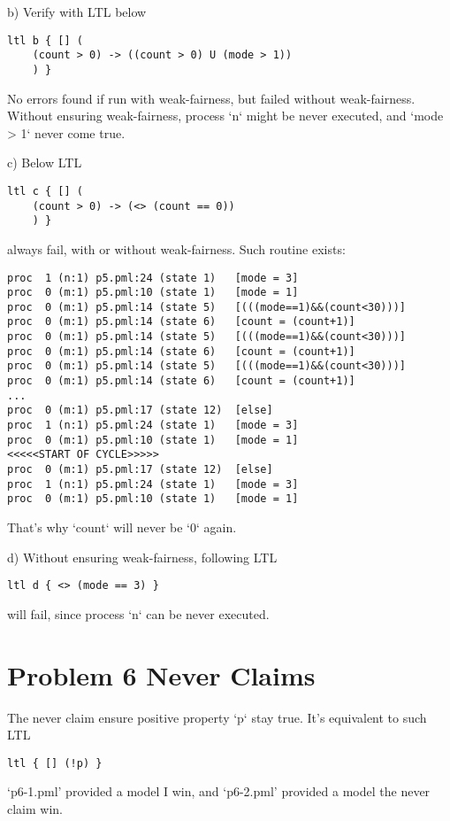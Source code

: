 \documentclass{ctexart}
\begin{document}
b) Verify with LTL below
\begin{lstlisting}[frame=single]
ltl b { [] (
	(count > 0) -> ((count > 0) U (mode > 1))
	) }
\end{lstlisting}
No errors found if run with weak-fairness, but failed without weak-fairness. Without ensuring weak-fairness, process `n` might be never executed, and `mode > 1` never come true.

c) Below LTL
\begin{lstlisting}[frame=single]
ltl c { [] (
	(count > 0) -> (<> (count == 0))
	) }
\end{lstlisting}
always fail, with or without weak-fairness. Such routine exists:
\begin{lstlisting}[frame=single]
proc  1 (n:1) p5.pml:24 (state 1)	[mode = 3]
proc  0 (m:1) p5.pml:10 (state 1)	[mode = 1]
proc  0 (m:1) p5.pml:14 (state 5)	[(((mode==1)&&(count<30)))]
proc  0 (m:1) p5.pml:14 (state 6)	[count = (count+1)]
proc  0 (m:1) p5.pml:14 (state 5)	[(((mode==1)&&(count<30)))]
proc  0 (m:1) p5.pml:14 (state 6)	[count = (count+1)]
proc  0 (m:1) p5.pml:14 (state 5)	[(((mode==1)&&(count<30)))]
proc  0 (m:1) p5.pml:14 (state 6)	[count = (count+1)]
...
proc  0 (m:1) p5.pml:17 (state 12)	[else]
proc  1 (n:1) p5.pml:24 (state 1)	[mode = 3]
proc  0 (m:1) p5.pml:10 (state 1)	[mode = 1]
<<<<<START OF CYCLE>>>>>
proc  0 (m:1) p5.pml:17 (state 12)	[else]
proc  1 (n:1) p5.pml:24 (state 1)	[mode = 3]
proc  0 (m:1) p5.pml:10 (state 1)	[mode = 1]
\end{lstlisting}
That's why `count` will never be `0` again.

d) Without ensuring weak-fairness, following LTL
\begin{lstlisting}[frame=single]
ltl d { <> (mode == 3) } 
\end{lstlisting}
will fail, since process `n` can be never executed.

\section*{Problem 6 Never Claims}
The never claim ensure positive property `p` stay true. It's equivalent to such LTL
\begin{lstlisting}[frame=single]
ltl { [] (!p) }
\end{lstlisting}
`p6-1.pml' provided a model I win, and `p6-2.pml' provided a model the never claim win.
\end{document}
